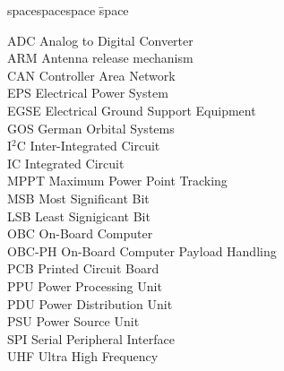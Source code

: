 
\begin{tabbing}
spacespacespace \= space \kill

ADC  \> Analog to Digital Converter\\
ARM \>  Antenna release mechanism\\
CAN \> Controller Area Network\\
EPS \>      Electrical Power System\\
EGSE \> Electrical Ground Support Equipment\\
GOS \> German Orbital Systems\\
I$^2$C \>   Inter-Integrated Circuit\\
IC \>  Integrated Circuit\\
MPPT \>    Maximum Power Point Tracking\\
MSB \>      Most Significant Bit\\
LSB \>      Least Signigicant Bit\\
OBC \> On-Board Computer\\
OBC-PH \> On-Board Computer Payload Handling\\
PCB \> Printed Circuit Board\\
PPU \> Power Processing Unit\\
PDU \> Power Distribution Unit\\
PSU \> Power Source Unit\\
SPI \> Serial Peripheral Interface\\ 

UHF \> Ultra High Frequency\\


\end{tabbing}
\endinput
